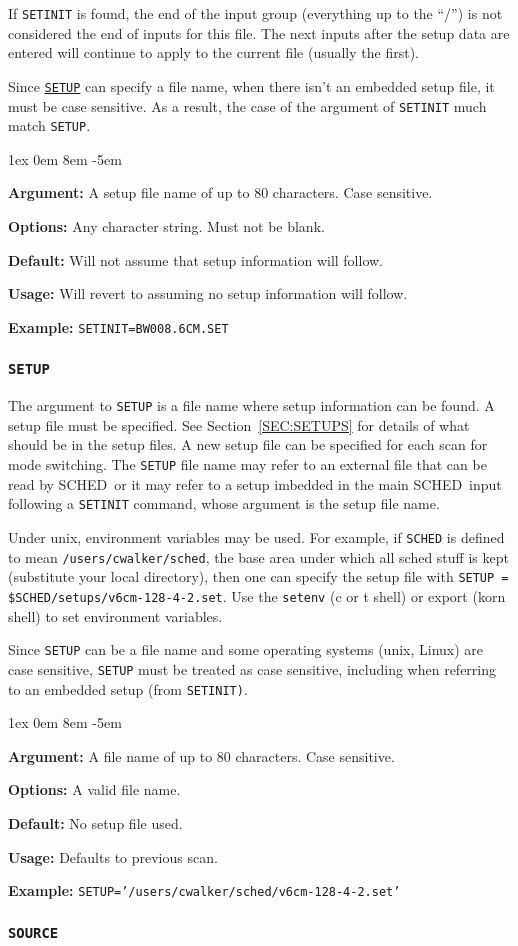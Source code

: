 \documentclass{report}
\newcommand{\schedb}{{\sc SCHED~}}
\newcommand{\rcwbox}[5]{
  \begin{list}{}{\parsep 1ex  \itemsep 0em
                 \leftmargin 8em  \itemindent -5em }
    \item {\bf Argument:} #1
    \item {\bf Options:}  #2
    \item {\bf Default:}  #3
    \item {\bf Usage:}    #4
    \item {\bf Example:}  #5
  \end{list}
}
\begin{document}
If {\tt SETINIT} is found, the end of the input group (everything up
to the ``/'') is not considered the end of inputs for this file.  The
next inputs after the setup data are entered will continue to apply to
the current file (usually the first).

Since 
{\hyperref[MP:SETUP]{{\tt SETUP}}} can specify a file name, when
there isn't an embedded setup file, it must be case sensitive.  As
a result, the case of the argument of {\tt SETINIT} much match
{\tt SETUP}.

\rcwbox
{A setup file name of up to 80 characters. Case sensitive.}
{Any character string.  Must not be blank.}
{Will not assume that setup information will follow.}
{Will revert to assuming no setup information will follow.}
{{\tt SETINIT=BW008.6CM.SET}}

\subsubsection{\label{MP:SETUP}{\tt SETUP}}

The argument to {\tt SETUP} is a file name where setup information can
be found.  A setup file must be specified.
See Section~\ref{SEC:SETUPS} for details of what should be in
the setup files. A new setup file can be specified for each scan for
mode switching.  The {\tt SETUP} file name may refer to an external
file that can be read by \schedb or it may refer to a setup
imbedded in the main \schedb input following a {\tt SETINIT}
command, whose argument is the setup file name.

Under unix, environment variables may be used.  For example, if
{\tt SCHED} is defined to mean {\tt /users/cwalker/sched}, the
base area under which all sched stuff is kept (substitute your
local directory), then one can specify the setup file with
{\tt SETUP = \$SCHED/setups/v6cm-128-4-2.set}.  Use the {\tt setenv}
(c or t shell) or export (korn shell) to set environment variables.

Since {\tt SETUP} can be a file name and some operating systems (unix,
Linux) are case sensitive, {\tt SETUP} must be treated as case sensitive,
including when referring to an embedded setup (from {\tt SETINIT)}.

\rcwbox
{A file name of up to 80 characters.  Case sensitive.}
{A valid file name.}
{No setup file used.}
{Defaults to previous scan.}
{{\tt SETUP='/users/cwalker/sched/v6cm-128-4-2.set'}}


\subsubsection{\label{MP:SOURCE}{\tt SOURCE}}
\end{document}
